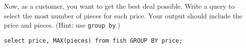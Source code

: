 \begin{blocksection}
\question Now, as a customer, you want to get the best deal possible. Write a query to select the most number of pieces for each price. Your output should include the price and pieces. (Hint: use \texttt{group by}.)

\begin{solution}[.75in]
\begin{lstlisting}
select price, MAX(pieces) from fish GROUP BY price;
\end{lstlisting}
\end{solution}
\end{blocksection}
